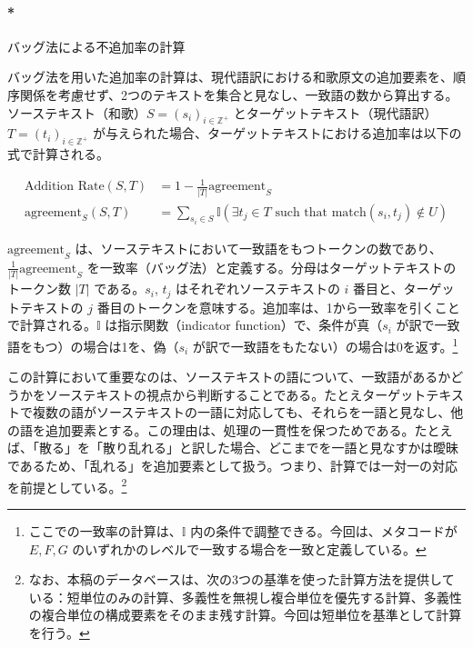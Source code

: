 \documentclass[
  letterpaper,
  DIV=11,
  numbers=noendperiod]{scrartcl}
\let\oldparagraph\paragraph
\renewcommand{\paragraph}[1]{\oldparagraph{#1}\mbox{}}
\begin{document}
\paragraph*{バッグ法による不追加率の計算}\label{ux30d0ux30c3ux30b0ux6cd5ux306bux3088ux308bux4e0dux8ffdux52a0ux7387ux306eux8a08ux7b97}

バッグ法を用いた追加率の計算は、現代語訳における和歌原文の追加要素を、順序関係を考慮せず、2つのテキストを集合と見なし、一致語の数から算出する。ソーステキスト（和歌）\(S=(s_i)_{i \in \mathbb{Z}^{+}}\)
とターゲットテキスト（現代語訳） \(T=(t_i)_{i \in \mathbb{Z}^{+}}\)
が与えられた場合、ターゲットテキストにおける追加率は以下の式で計算される。

\[
\begin{align}
\text{Addition Rate}(S,T) &= 1 - \frac{1}{|T|}\text{agreement}_{S}\\
\text{agreement}_{S}(S,T) &= \sum_{s_i \in S} \mathbb{I} \left( \exists t_j \in T \text{ such that } \text{match}(s_i, t_j) \notin U \right)
\end{align}
\]

\(\text{agreement}_{S}\)
は、ソーステキストにおいて一致語をもつトークンの数であり、\(\frac{1}{|T|}\text{agreement}_{S}\)
を一致率（バッグ法）と定義する。分母はターゲットテキストのトークン数
\(|T|\) である。\(s_i\), \(t_j\) はそれぞれソーステキストの \(i\)
番目と、ターゲットテキストの \(j\)
番目のトークンを意味する。追加率は、1から一致率を引くことで計算される。\(\mathbb{I}\)
は指示関数（indicator function）で、条件が真（\(s_i\)
が訳で一致語をもつ）の場合は1を、偽（\(s_i\)
が訳で一致語をもたない）の場合は0を返す。\footnote{ここでの一致率の計算は、\(\mathbb{I}\)
  内の条件で調整できる。今回は、メタコードが \(E, F, G\)
  のいずれかのレベルで一致する場合を一致と定義している。}

この計算において重要なのは、ソーステキストの語について、一致語があるかどうかをソーステキストの視点から判断することである。たとえターゲットテキストで複数の語がソーステキストの一語に対応しても、それらを一語と見なし、他の語を追加要素とする。この理由は、処理の一貫性を保つためである。たとえば、「散る」を「散り乱れる」と訳した場合、どこまでを一語と見なすかは曖昧であるため、「乱れる」を追加要素として扱う。つまり、計算では一対一の対応を前提としている。\footnote{なお、本稿のデータベースは、次の3つの基準を使った計算方法を提供している：短単位のみの計算、多義性を無視し複合単位を優先する計算、多義性の複合単位の構成要素をそのまま残す計算。今回は短単位を基準として計算を行う。}
\end{document}

